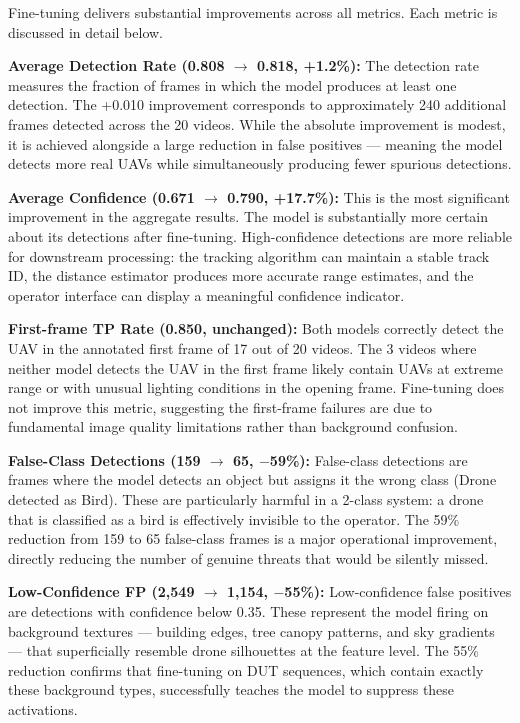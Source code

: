 \documentclass[12pt,a4paper]{report}
\begin{document}
Fine-tuning delivers substantial improvements across all metrics. Each metric
is discussed in detail below.

\textbf{Average Detection Rate (0.808 $\to$ 0.818, +1.2\%):}
The detection rate measures the fraction of frames in which the model
produces at least one detection. The +0.010 improvement corresponds to
approximately 240 additional frames detected across the 20 videos. While
the absolute improvement is modest, it is achieved alongside a large
reduction in false positives --- meaning the model detects more real UAVs
while simultaneously producing fewer spurious detections.

\textbf{Average Confidence (0.671 $\to$ 0.790, +17.7\%):}
This is the most significant improvement in the aggregate results. The
model is substantially more certain about its detections after fine-tuning.
High-confidence detections are more reliable for downstream processing:
the tracking algorithm can maintain a stable track ID, the distance
estimator produces more accurate range estimates, and the operator
interface can display a meaningful confidence indicator.

\textbf{First-frame TP Rate (0.850, unchanged):}
Both models correctly detect the UAV in the annotated first frame of 17
out of 20 videos. The 3 videos where neither model detects the UAV in the
first frame likely contain UAVs at extreme range or with unusual lighting
conditions in the opening frame. Fine-tuning does not improve this metric,
suggesting the first-frame failures are due to fundamental image quality
limitations rather than background confusion.

\textbf{False-Class Detections (159 $\to$ 65, $-$59\%):}
False-class detections are frames where the model detects an object but
assigns it the wrong class (Drone detected as Bird). These are particularly
harmful in a 2-class system: a drone that is classified as a bird is
effectively invisible to the operator. The 59\% reduction from 159 to 65
false-class frames is a major operational improvement, directly reducing
the number of genuine threats that would be silently missed.

\textbf{Low-Confidence FP (2,549 $\to$ 1,154, $-$55\%):}
Low-confidence false positives are detections with confidence below 0.35.
These represent the model firing on background textures --- building edges,
tree canopy patterns, and sky gradients --- that superficially resemble
drone silhouettes at the feature level. The 55\% reduction confirms that
fine-tuning on DUT sequences, which contain exactly these background types,
successfully teaches the model to suppress these activations.
\end{document}
